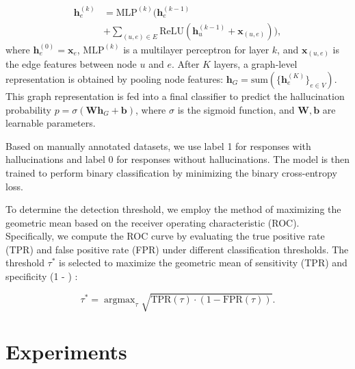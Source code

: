 \documentclass[11pt]{article}
\begin{document}
\begin{equation}
\begin{split}
    \mathbf{h}_e^{(k)} &= \text{MLP}^{(k)} \bigg( \mathbf{h}_e^{(k-1)} \\ 
    & + \sum_{(u, e) \in E} \text{ReLU}\left( \mathbf{h}_u^{(k-1)} + \mathbf{x}_{(u,e)} \right) \bigg),
\end{split}
\end{equation}
where $\mathbf{h}_e^{(0)} = \mathbf{x}_e$, $\text{MLP}^{(k)}$ is a multilayer perceptron for layer $k$, and $\mathbf{x}_{(u,e)}$ is the edge features between node $u$ and $e$.
\nobreak
After $K$ layers, a graph-level representation is obtained by pooling node features: $\mathbf{h}_G = \text{sum}\left( \{\mathbf{h}_e^{(K)}\}_{e \in V} \right)$. This graph representation is fed into a final classifier to predict the hallucination probability $p = \sigma\left( \mathbf{W} \mathbf{h}_G + \textbf{b} \right)$, where $\sigma$ is the sigmoid function, and $\mathbf{W}, \textbf{b}$  are learnable parameters.

Based on manually annotated datasets, we use label 1 for responses with hallucinations and label 0 for responses without hallucinations. The model is then trained to perform binary classification by minimizing the binary cross-entropy loss.

To determine the detection threshold, we employ the method of maximizing the geometric mean based on the receiver operating characteristic (ROC).
Specifically, we compute the ROC curve by evaluating the true positive rate (TPR) and false positive rate (FPR) under different classification thresholds.
The threshold $\tau^*$ is selected to maximize the geometric mean of sensitivity (TPR) and specificity (1 - ) \cite{davis2006relationship}:

\begin{equation}
 \tau^* = \mathop{\mathrm{argmax}}_{\tau} \sqrt{\text{TPR}(\tau) \cdot (1 - \text{FPR}(\tau))}.
\end{equation}


\section{Experiments}
\end{document}
